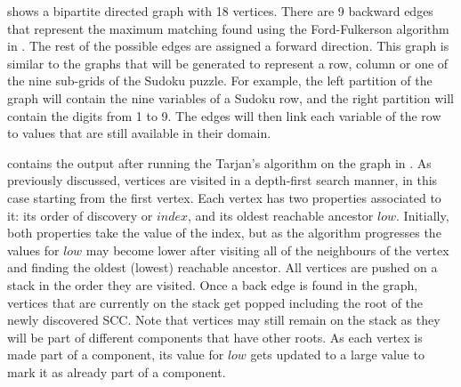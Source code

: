 \documentclass{l4proj}
\begin{document}
\noindent {} shows a bipartite directed graph with 18 vertices. There are 9 backward edges that represent the maximum matching found using the Ford-Fulkerson algorithm \cite{ford1956maximal} in . The rest of the possible edges are assigned a forward direction. This graph is similar to the graphs that will be generated to represent a row, column or one of the nine sub-grids of the Sudoku puzzle. For example, the left partition of the graph will contain the nine variables of a Sudoku row, and the right partition will contain the digits from 1 to 9. The edges will then link each variable of the row to values that are still available in their domain.

\noindent {} contains the output after running the Tarjan's algorithm \cite{tarjan1972depth} on the graph in . As previously discussed, vertices are visited in a depth-first search manner, in this case starting from the first vertex. Each vertex has two properties associated to it: its order of discovery or $index$, and its oldest reachable ancestor $low$. Initially, both properties take the value of the index, but as the algorithm progresses the values for $low$ may become lower after visiting all of the neighbours of the vertex and finding the oldest (lowest) reachable ancestor. All vertices are pushed on a stack in the order they are visited. Once a back edge is found in the graph, vertices that are currently on the stack get popped including the root of the newly discovered SCC. Note that vertices may still remain on the stack as they will be part of different components that have other roots. As each vertex is made part of a component, its value for $low$ gets updated to a large value to mark it as already part of a component.

\newpage
\end{document}

